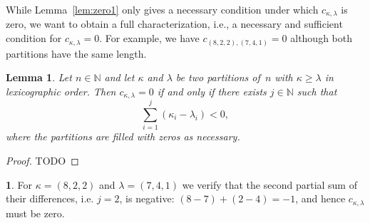 \documentclass[10pt,oneside,american]{amsart}
\numberwithin{equation}{section}
\numberwithin{figure}{section}
\theoremstyle{definition}
\theoremstyle{remark}
\theoremstyle{plain}
\theoremstyle{definition}
\newtheorem{example}{\protect\examplename}[section]
\theoremstyle{plain}
\theoremstyle{plain}
\newtheorem{lemma}{Lemma}[section]
\theoremstyle{plain}
\providecommand{\examplename}{Example}
\begin{document}
While Lemma~\ref{lem:zero1} only gives a necessary condition under which
$c_{\kappa,\lambda}$ is zero, we want to obtain a full characterization, i.e.,
a necessary and sufficient condition for $c_{\kappa,\lambda}=0$. For example,
we have $c_{(8,2,2),(7,4,1)} = 0$ although both partitions have the same length.
\begin{lemma}\label{lem:zero2}
  Let $n\in\mathbb{N}$ and let $\kappa$ and $\lambda$ be two partitions of~$n$
  with $\kappa\geq\lambda$ in lexicographic order. Then $c_{\kappa,\lambda}=0$
  if and only if there exists $j\in\mathbb{N}$ such that
  \[
    \sum_{i=1}^j (\kappa_i - \lambda_i) < 0,
  \]
  where the partitions are filled with zeros as necessary.
\end{lemma}
\begin{proof}
  TODO
\end{proof}

\begin{example}
  For $\kappa=(8,2,2)$ and $\lambda=(7,4,1)$ we verify that the second
  partial sum of their differences, i.e. $j=2$, is negative:
  $(8-7)+(2-4)=-1$, and hence $c_{\kappa,\lambda}$ must be zero.
\end{example}
\end{document}

